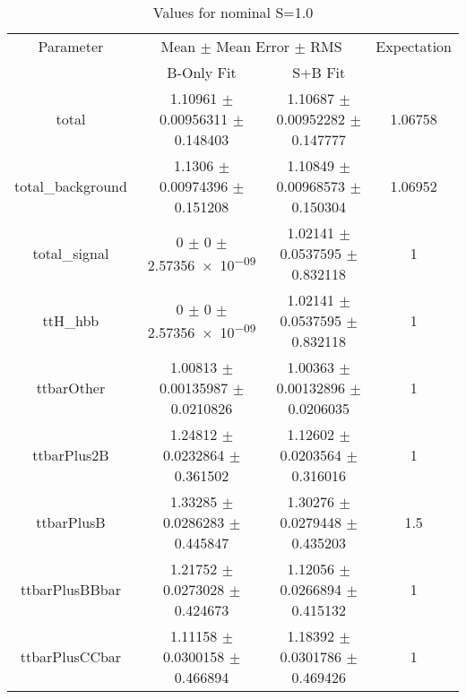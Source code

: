 \begin{table}
\centering
\caption{Values for nominal S=1.0}
\begin{tabular}{cccc}
\toprule
Parameter & \multicolumn{2}{c}{Mean $\pm$ Mean Error $\pm$ RMS} & Expectation\\
 & B-Only Fit & S+B Fit & \\
\midrule
total & \num{1.10961} $\pm$ \num{0.00956311} $\pm$ \num{0.148403} & \num{1.10687} $\pm$ \num{0.00952282} $\pm$ \num{0.147777} & \num{1.06758}\\
total\_background & \num{1.1306} $\pm$ \num{0.00974396} $\pm$ \num{0.151208} & \num{1.10849} $\pm$ \num{0.00968573} $\pm$ \num{0.150304} & \num{1.06952}\\
total\_signal & \num{0} $\pm$ \num{0} $\pm$ \num{2.57356e-09} & \num{1.02141} $\pm$ \num{0.0537595} $\pm$ \num{0.832118} & \num{1}\\
ttH\_hbb & \num{0} $\pm$ \num{0} $\pm$ \num{2.57356e-09} & \num{1.02141} $\pm$ \num{0.0537595} $\pm$ \num{0.832118} & \num{1}\\
ttbarOther & \num{1.00813} $\pm$ \num{0.00135987} $\pm$ \num{0.0210826} & \num{1.00363} $\pm$ \num{0.00132896} $\pm$ \num{0.0206035} & \num{1}\\
ttbarPlus2B & \num{1.24812} $\pm$ \num{0.0232864} $\pm$ \num{0.361502} & \num{1.12602} $\pm$ \num{0.0203564} $\pm$ \num{0.316016} & \num{1}\\
ttbarPlusB & \num{1.33285} $\pm$ \num{0.0286283} $\pm$ \num{0.445847} & \num{1.30276} $\pm$ \num{0.0279448} $\pm$ \num{0.435203} & \num{1.5}\\
ttbarPlusBBbar & \num{1.21752} $\pm$ \num{0.0273028} $\pm$ \num{0.424673} & \num{1.12056} $\pm$ \num{0.0266894} $\pm$ \num{0.415132} & \num{1}\\
ttbarPlusCCbar & \num{1.11158} $\pm$ \num{0.0300158} $\pm$ \num{0.466894} & \num{1.18392} $\pm$ \num{0.0301786} $\pm$ \num{0.469426} & \num{1}\\
\bottomrule
\end{tabular}
\end{table}